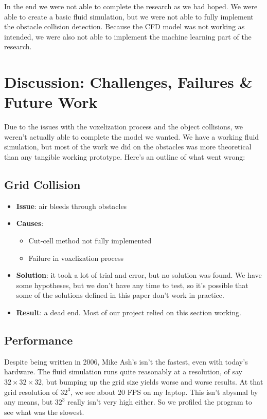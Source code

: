 \documentclass[a4paper,12pt,titlepage]{article}
\begin{document}
In the end we were not able to complete the research as we had hoped. We were able to create a basic fluid simulation, 
but we were not able to fully implement the obstacle collision detection. Because the CFD model was not working as intended, 
we were also not able to implement the machine learning part of the research.

\pagebreak
\section{Discussion: Challenges, Failures \& Future Work}
Due to the issues with the voxelization process and the object collisions, we
weren't actually able to complete the model we wanted. We have a working fluid
simulation, but most of the work we did on the obstacles was more theoretical
than any tangible working prototype. Here's an outline of what went wrong:

\subsection{Grid Collision}
\begin{itemize}
	\item{\textbf{Issue}: air bleeds through obstacles}
	\item{\textbf{Causes}:}
		\begin{itemize}
			\item{Cut-cell method not fully implemented}
			\item{Failure in voxelization process}
		\end{itemize}
	\item{
			\textbf{Solution}: it took a lot of trial and error, but no solution
			was found. We have some hypotheses, but we don't have any time to test,
			so it's possible that some of the solutions defined in this paper don't
			work in practice.
		}
	\item{\textbf{Result}: a dead end. Most of our project relied on this section working.}
\end{itemize}

\subsection{Performance}
Despite being written in 2006, Mike Ash's isn't the fastest, even with today's
hardware. The fluid simulation runs quite reasonably at a resolution, of say
$32\times32\times32$, but bumping up the grid size yields worse and worse results.
At that grid resolution of $32^3$, we see about 20 FPS on my laptop. This isn't
abysmal by any means, but $32^3$ really isn't very high either. So we profiled
the program to see what was the slowest.
\end{document}
